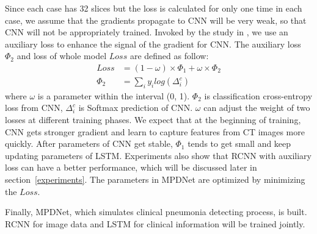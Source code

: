 \documentclass[journal]{IEEEtran}
\begin{document}
Since each case has 32 slices but the loss is calculated for only one time in each case, we assume that the gradients propagate to CNN will be very weak, so that CNN will not be appropriately trained. Invoked by the study in \cite{szegedy2016rethinking}, we use an auxiliary loss to enhance the signal of the gradient for CNN.
The auxiliary loss $\Phi_2$ and loss of whole model $Loss$ are defined as follow: 
\begin{align*}
Loss &=  (1 - \omega) \times \Phi_1 +  \omega \times \Phi_2 \\
\Phi_2 &= \sum_i{y_i log(\Delta^c_i)}
\end{align*}
where $\omega$ is a parameter within the interval (0, 1). $\Phi_2$ is classification cross-entropy loss from CNN, $\Delta^c_i$ is Softmax prediction of CNN. $\omega$ can adjust the weight of two losses at different training phases.
We expect that at the beginning of training, CNN gets stronger gradient and learn to capture features from CT images more quickly. After parameters of CNN get stable, $\Phi_1$ tends to get small and keep updating parameters of LSTM. Experiments also show that RCNN with auxiliary loss can have a better performance, which will be discussed later in section~\ref{experiments}. The parameters in MPDNet are optimized by minimizing the $Loss$.


Finally, MPDNet, which simulates clinical pneumonia detecting process, is built. RCNN for image data and LSTM for clinical information will be trained jointly.
\end{document}
